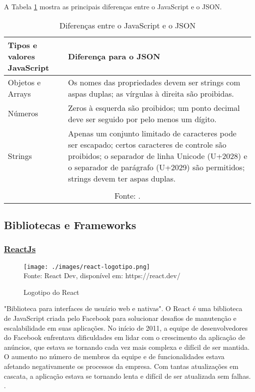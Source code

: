 A
Tabela \ref{tbl:json-descs}
mostra as principais
diferenças entre o JavaScript e o JSON.

\begin{table}[H]
    \centering
    \caption{Diferenças entre o JavaScript e o JSON}
    \label{tbl:json-descs}
    \renewcommand{\arraystretch}{1.5}
    \begin{tabular}{p{5.6000cm} p{10.4000cm}}
        \hline
        \textbf{Tipos e valores JavaScript} & \textbf{Diferença para o JSON} \\
        \hline
        Objetos e Arrays & Os nomes das propriedades devem ser strings com aspas duplas; as vírgulas à direita são proibidas. \\
		Números & Zeros à esquerda são proibidos; um ponto decimal deve ser seguido por pelo menos um dígito. \\
		Strings & Apenas um conjunto limitado de caracteres pode ser escapado; certos caracteres de controle são proibidos; o separador de linha Unicode (U+2028) e o separador de parágrafo (U+2029) são permitidos; strings devem ter aspas duplas.
             \\
        \hline
        \\\multicolumn{2}{c}{\fontsize{10pt}{12pt}Fonte: \cite{mdn-json}.}
    \end{tabular}
\end{table}

\subsection{Bibliotecas e Frameworks}

\subsubsection{\underline{ReactJs}}

\begin{figure}[H]
    \centering
    \caption{Logotipo do React}
    \texttt{[image: ./images/react-logotipo.png]}
    \label{fig:react-logotipo} \\
    \textnormal{\fontsize{10pt}{12pt}Fonte: React Dev, disponível em: https://react.dev/}
\end{figure}

"Biblioteca para interfaces de usuário \acrshort{web} e nativas".
O React é uma biblioteca de JavaScript criada pelo Facebook para solucionar
desafios de manutenção e escalabilidade em suas aplicações. No início de 2011, a equipe de
desenvolvedores do Facebook enfrentava dificuldades em lidar com o crescimento da
aplicação de anúncios, que estava se tornando cada vez mais complexa e difícil de ser
mantida. O aumento no número de membros da equipe e de funcionalidades estava afetando
negativamente os processos da empresa. Com tantas atualizações em cascata, a aplicação
estava se tornando lenta e difícil de ser atualizada sem falhas.
\cite{morais-react}.

